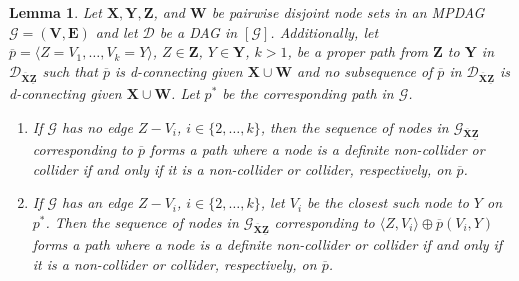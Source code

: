 \documentclass[11pt]{article}
\newtheorem{lemma}[theorem]{Lemma}
\newcommand{\mb}[1]{\mathbf{#1}}
\newcommand{\g}[1][G]{\mathcal{#1}}
\begin{document}
\begin{lemma}
\label{lem:zhang-modify-2a}
    Let $\mb{X,Y,Z}$, and $\mb{W}$ be pairwise disjoint node sets in an MPDAG $\g = (\mb{V,E})$ and let $\g[D]$ be a DAG in $[\g]$. Additionally, let $\overline{p} = \langle Z=V_1, \dots, V_k=Y \rangle$, $Z \in \mb{Z}$, $Y \in \mb{Y}$, $k > 1$, be a proper path from $\mb{Z}$ to $\mb{Y}$ in ${\g[D]_{\overline{\mb{X}}\underline{\mb{Z}}}}$ such that $\overline{p}$ is d-connecting given $\mb{X} \cup \mb{W}$ and no subsequence of $\overline{p}$ in ${\g[D]_{\overline{\mb{X}}\underline{\mb{Z}}}}$ is d-connecting given $\mb{X} \cup \mb{W}$. Let $p^*$ be the corresponding path in $\g$. 
    \begin{enumerate}[label = (\roman*)]
        \item\label{lem:zhang-modify-2a-two}
        If $\g$ has no edge $Z - V_i$, $i \in \{2, \dots, k\}$, then the sequence of nodes in $\g_{\overline{\mb{X}}\underline{\mb{Z}}}$ corresponding to $\overline{p}$ forms a path where a node is a definite non-collider or collider if and only if it is a non-collider or collider, respectively, on $\overline{p}$.

        \item\label{lem:zhang-modify-2a-three} 
        If $\g$ has an edge $Z - V_i$, $i \in \{2, \dots, k\}$, let $V_i$ be the closest such node to $Y$ on $p^*$. Then the sequence of nodes in $\g_{\overline{\mb{X}}\underline{\mb{Z}}}$ corresponding to $\langle Z, V_i \rangle \oplus \overline{p}(V_i, Y)$ forms a path where a node is a definite non-collider or collider if and only if it is a non-collider or collider, respectively, on $\overline{p}$.
    \end{enumerate}
\end{lemma}
\end{document}
